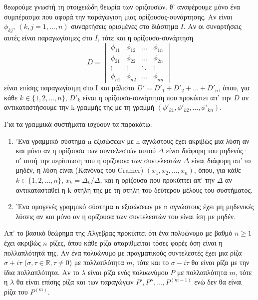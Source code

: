 \documentclass[11pt,a4paper,twoside]{book}
\newcommand{\eng}[1]{\selectlanguage{english}#1\selectlanguage{greek}}
\begin{document}
θεωρούμε γνωστή τη στοιχειώδη θεωρία των οριζουσών. θ' αναφέρουμε μόνο ένα συμπέρασμα που αφορά την παράγωγιση μιας ορίζουσας-συνάρτησης. Αν είναι $\phi_{kj},\ (k,j=1,\dots,n)$ συναρτήσεις ορισμένες στο διάστημα $Ι$. Αν οι συναρτήσεις αυτές είναι παραγωγίσιμες στο $Ι$, τότε και η ορίζουσα-συνάρτηση
\[
D = \begin{vmatrix}
\phi_{11} & \phi_{12} & \dots & \phi_{1n} \\
\phi_{21} & \phi_{22} & \dots & \phi_{2n} \\
\vdots & \vdots & \ddots & \vdots \\
\phi_{n1} & \phi_{n2} & \dots & \phi_{nn}
\end{vmatrix}
\]
είναι επίσης παραγωγίσιμη στο Ι και μάλιστα $D' = D'_1 + D'_2 + \dots + D'_n$, όπου, για κάθε $k\in\{1,2,\dots,n\}$, $D'_k$ είναι η ορίζουσα-συνάρτηση που προκύπτει απ' την $D$ αν αντικαταστήσουμε την k-γραμμής της με τη γραμμή $(\phi'_{k1}, \phi'_{k2}, \dots, \phi'_{kn})$.

Για τα γραμμικά συστήματα ισχύουν τα παρακάτω:
\begin{enumerate}[label=(\roman*)]
\item 'Ενα γραμμικό σύστημα n εξισώσεων με n αγνώστους έχει ακριβώς μια λύση αν και μόνο αν η ορίζουσα των συντελεστών αυτού $\Delta$ είναι διάφορη του μηδενός· σ' αυτή την περίπτωση που η ορίζουσα των συντελεστών $\Delta$ είναι διάφορη απ' το μηδέν, η λύση είναι (Κανόνας του \eng{Cramer}) $(x_1, x_2, \dots, x_n)$, όπου, για κάθε $k\in\{1,2,\dots,n\}$, $x_k = \Delta_k/\Delta$, και η ορίζουσα που προκύπτει απ' την $\Delta$ αν αντικατασταθεί η k-στήλη της με τη στήλη του δεύτερου μέλους του συστήματος.
\item 'Ενα ομογενές γραμμικό σύστημα n εξισώσεων με n αγνώστους έχει μη μηδενικές λύσεις αν και μόνο αν η ορίζουσα των συντελεστών του είναι ίση με μηδέν.
\end{enumerate}

Απ' το βασικό θεώρημα της Άλγεβρας προκύπτει ότι ένα πολυώνυμο με βαθμό $n\ge 1$ έχει ακριβώς $n$ ρίζες, όπου κάθε ρίζα απαριθμείται τόσες φορές όση είναι η πολλαπλότητά της. Αν ένα πολυώνυμο με πραγματικούς συντελεστές έχει μια ρίζα $\sigma+i\tau$ ($\sigma, \tau \in \mathbb{R}, \tau \ne 0$) με πολλαπλότητα $m$, τότε και το $\sigma-i\tau$ θα είναι ρίζα με την ίδια πολλαπλότητα. Αν το $\lambda$ είναι ρίζα ενός πολυωνύμου $P$ με πολλαπλότητα $m$, τότε η $\lambda$ θα είναι επίσης ρίζα και των παραγώγων $P', P'', \dots, P^{(m-1)}$ ενώ δεν θα είναι ρίζα του $P^{(m)}$.
\end{document}
